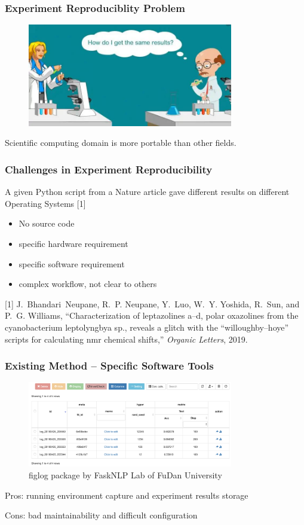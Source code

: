 \documentclass[notheorems]{beamer}
\begin{document}
\begin{frame}
\frametitle{Experiment Reproduciblity Problem}
\begin{figure}
\includegraphics[width=0.8\textwidth]{pic/reproducibility_in_Science.jpg}
\end{figure}
Scientific computing domain is more portable than other fields.
\end{frame}
\begin{frame}
\frametitle{Challenges in Experiment Reproducibility}

A given Python script from a Nature article gave different results on different Operating Systems [1]

\begin{itemize}
\item No source code
\item specific hardware requirement
\item specific software requirement
\item complex workflow, not clear to others
\end{itemize}

\vskip 1cm
{\tiny [1] J.~Bhandari~Neupane, R.~P. Neupane, Y.~Luo, W.~Y. Yoshida, R.~Sun, and P.~G.
  Williams, ``Characterization of leptazolines a--d, polar oxazolines from the
  cyanobacterium leptolyngbya sp., reveals a glitch with the
  “willoughby--hoye” scripts for calculating nmr chemical shifts,''
  \emph{Organic Letters}, 2019.
 } 
 
\end{frame}

\begin{frame}
\frametitle{Existing Method -- Specific Software Tools}

\begin{figure}
\includegraphics[width=0.8\textwidth]{pic/fitlog_table.png}
\caption{figlog package by FaskNLP Lab of FuDan University}
\end{figure}
Pros: running environment capture and experiment results storage

Cons: bad maintainability and difficult configuration
\end{frame}
\end{document}
